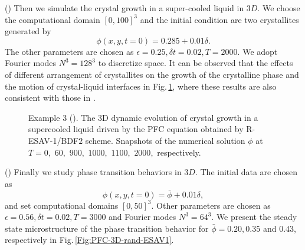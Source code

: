 \documentclass[final,review,onefignum,onetabnum]{siamart190516}
\theoremstyle{plain}
\begin{document}
() Then we simulate the crystal growth in a super-cooled liquid in $3D$. 
We choose the computational domain $[0, 100]^3$ and the initial condition are two crystallites generated by 
$$\phi(x, y, t=0)=0.285+0.01\delta.$$
The other parameters are chosen as $\epsilon=0.25, \delta t = 0.02, T=2000$. 
We adopt Fourier modes $N^3=128^{3}$  to discretize space. 
It can be observed that the effects of different arrangement of crystallites on the growth of the crystalline phase and the motion of crystal-liquid interfaces in Fig.\,\ref{Fig:PFC-3D-crystal-growth-ESAV1}, where these results are also consistent with those in \cite{li2019efficient}.

\begin{figure}[htbp]
\centering
{} 
\label{Fig:PFC-3D-crystal-growth-ESAV1}
\caption{Example 3 (). The $3$D dynamic evolution of crystal growth in a supercooled liquid driven by the PFC equation obtained by R-ESAV-1/BDF$2$ scheme. Snapshots of the numerical solution $\phi$ at $T=0,$ $60,$ $900,$ $1000,$ $1100,$ $2000,$ respectively.}
\end{figure}

()  Finally we study phase transition behaviors in $3D$.  The initial data are chosen as
$$\phi(x, y, t=0)=\bar{\phi}+0.01\delta,$$  
and set computational domains $\left[0, 50\right]^{3}$. 
Other parameters are chosen as $\epsilon=0.56, \delta t=0.02, T=3000$ and Fourier modes $N^3=64^3$. We present the steady state
microstructure of the phase transition behavior for $\bar{\phi}=0.20, 0.35$ and $0.43$, respectively in Fig.\,\ref{Fig:PFC-3D-rand-ESAV1}. 
\end{document}
